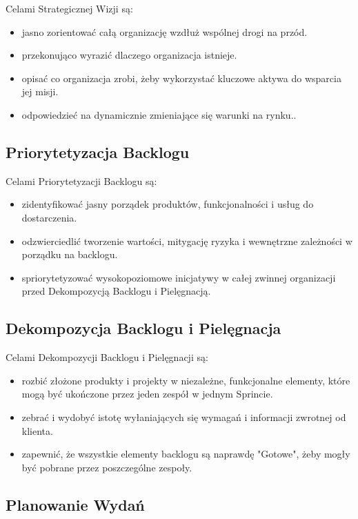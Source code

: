 \documentclass[12pt,a4paper,parskip=full]{scrartcl}
\begin{document}
Celami Strategicznej Wizji są:

\begin{itemize}
	\item jasno zorientować całą organizację wzdłuż wspólnej drogi na przód.
	\item przekonująco wyrazić dlaczego organizacja istnieje.
	\item opisać co organizacja zrobi, żeby wykorzystać kluczowe aktywa do wsparcia jej misji.
	\item odpowiedzieć na dynamicznie zmieniające się warunki na rynku..
\end{itemize}

\subsection{Priorytetyzacja Backlogu}

Celami Priorytetyzacji Backlogu są:

\begin{itemize}
	\item zidentyfikować jasny porządek produktów, funkcjonalności i usług do dostarczenia.
	\item odzwierciedlić tworzenie wartości, mitygację ryzyka i wewnętrzne zależności w porządku na backlogu.
	\item spriorytetyzować wysokopoziomowe inicjatywy w całej zwinnej organizacji przed Dekompozycją Backlogu i Pielęgnacją.
\end{itemize}

\subsection{Dekompozycja Backlogu i Pielęgnacja}

Celami Dekompozycji Backlogu i Pielęgnacji są:

\begin{itemize}
	\item rozbić złożone produkty i projekty w niezależne, funkcjonalne elementy, które mogą być ukończone przez jeden zespół w jednym Sprincie.
	\item zebrać i wydobyć istotę wyłaniających się wymagań i informacji zwrotnej od klienta.
	\item zapewnić, że wszystkie elementy backlogu są naprawdę "Gotowe", żeby mogły być pobrane przez poszczególne zespoły.
\end{itemize}

\subsection{Planowanie Wydań}
\end{document}
